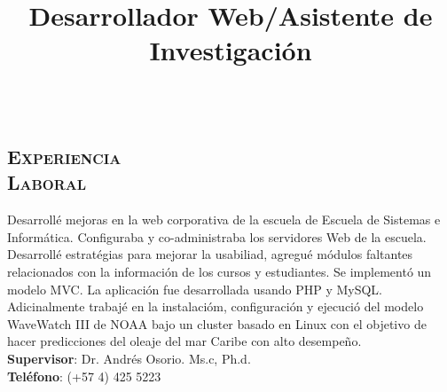 \begin{resume}
\section{\textsc{\\Experiencia \\ Laboral}}

\title{\textbf{Desarrollador Web/Asistente de Investigaci\'{o}n} }
\begin{position}
Desarroll\'{e} mejoras en la web corporativa de la escuela de Escuela
de Sistemas e Inform\'{a}tica. Configuraba y  co-administraba los
servidores Web de la escuela. Desarroll\'{e} estrat\'{e}gias para
mejorar la usabiliad, agregu\'{e} m\'{o}dulos faltantes relacionados
con la informaci\'{o}n de los cursos y estudiantes. Se implement\'{o}
un modelo MVC. La aplicaci\'{o}n fue desarrollada usando PHP y
MySQL.\\
Adicinalmente trabaj\'{e} en la instalaci\'{o}m, configuraci\'{o}n y ejecuci\'{o}  del modelo WaveWatch III de NOAA bajo un cluster basado en Linux con el objetivo de hacer predicciones del oleaje del mar Caribe con alto desempe\~{n}o.\\
\textbf{Supervisor}: Dr. Andr\'{e}s Osorio. Ms.c, Ph.d.\\
\textbf{Tel\'{e}fono}: (+57 4) 425 5223
\end{position}




\end{resume}
